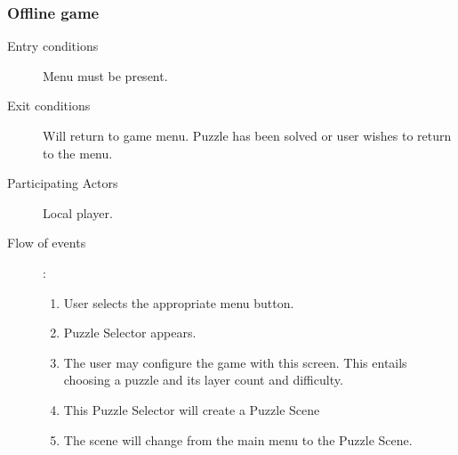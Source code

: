 \documentclass[12pt]{article}
\begin{document}
\begin{mdframed}
    \subsubsection{Offline game}
    \begin{description}
        \item[Entry conditions] Menu must be present.
        \item[Exit conditions] Will return to game menu. Puzzle has been
            solved or user wishes to return to the menu.
        \item[Participating Actors] Local player.
        \item[Flow of events]:
            \begin{enumerate}
                \item User selects the appropriate menu button.
                \item Puzzle Selector appears.
                \item The user may configure the game with this screen. This
                    entails choosing a puzzle and its layer count and difficulty.
                \item This Puzzle Selector will create a Puzzle Scene
                \item The scene will change from the main menu to the Puzzle
                    Scene.
            \end{enumerate}
    \end{description}
\end{mdframed}
\end{document}
